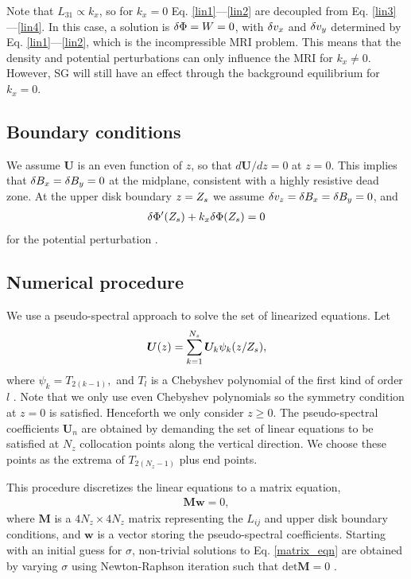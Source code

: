 Note that $L_{31}\propto k_x$, so for $k_x=0$ 
Eq. \ref{lin1}---\ref{lin2} are decoupled from 
Eq. \ref{lin3}---\ref{lin4}. In this case, a solution is $\delta \Phi=W=0$,
with $\delta v_x$ and $\delta v_y$ determined by Eq. \ref{lin1}---\ref{lin2},
which is the incompressible MRI problem. This means that the density
and potential perturbations can only influence the MRI for
$k_x\neq0$. However, SG will still have an effect through the
background equilibrium for $k_x=0$. 

\subsection{Boundary conditions}
We assume $\bm{U}$ is an even function of $z$, so that $d\bm{U}/dz=0$
at $z=0$. This implies that $\delta B_x=\delta B_y=0$ at the midplane, consistent
with a highly resistive dead zone. At the upper disk boundary
$z=Z_s$ we assume 
$\delta v_z=\delta B_x=\delta B_y=0$, and 
\begin{align}
  \delta \Phi^\prime(Z_s) + k_x\delta \Phi(Z_s) = 0
\end{align}
for the potential perturbation \citep[see][]{goldreich65a}.  

\subsection{Numerical procedure}
We use a pseudo-spectral approach to solve the set of linearized
equations. Let
\begin{align}\label{cheby_expand}
  \bm{U}(z) 
  = \sum_{k=1}^{N_z} \bm{U}_k\psi_k(z/Z_s), 
\end{align}
where $  \psi_k  = T_{2(k-1)},  $ and  $T_l$ is a Chebyshev polynomial of the first
kind of order $l$ \citep{stegun65}. %
Note that we only use even Chebyshev polynomials so the symmetry 
condition at $z=0$ is satisfied. Henceforth we only consider $z\geq 0$. 
The pseudo-spectral coefficients $\bm{U}_n$  are obtained by demanding
the set of linear equations to be satisfied at $N_z$ collocation
points along the vertical direction. We choose these points as the
extrema of $T_{2(N_z-1)}$ plus end points. 

This procedure discretizes the linear equations to a matrix equation,
\begin{align}\label{matrix_eqn}
\bm{M}\bm{w} = 0, 
\end{align}
where $\bm{M}$ is a $4N_z\times 4 N_z$ matrix representing the $L_{ij}$ 
and upper disk boundary conditions, 
and $\bm{w}$ is a vector storing the pseudo-spectral coefficients. 
Starting with an initial guess for $\sigma$, non-trivial solutions to
Eq. \ref{matrix_eqn} are obtained by varying $\sigma$ using Newton-Raphson iteration 
such that $\mathrm{det}\bm{M}=0$ \citep[details can be found in][]{lin12}.

